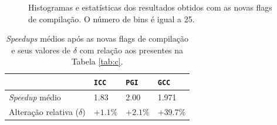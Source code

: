 \begin{figure}[ht!]
	\vspace{0mm}	%
	\begin{center}
	\end{center}
	\vspace{2mm}	%
	\caption{Histogramas e estatísticas dos resultados obtidos com as novas flags de compilação. O número de bins é igual a 25.}
	\legenda{}	%
	\label{fig:2_hist}
\vspace{-8mm}
\end{figure}


\begin{table}[H]
\center
\caption{\textit{Speedups} médios após as novas flags de compilação e seus  valores de $\delta$ com relação aos presentes na Tabela \ref{tab:c}.} 
\begin{tabular}{@{}l l l l@{}}
\toprule
& \texttt{ICC} & \texttt{PGI} &  \texttt{GCC} \\
\midrule
\textit{Speedup} médio & 1.83 & 2.00 & 1.971 \\ 
Alteração relativa ($\delta$) & $+1.1\%$ & $+2.1\%$ & $+39.7\%$ \\ 
\bottomrule
\end{tabular}
\label{tab:2_spedups}
\vspace{-10mm}
\end{table}


